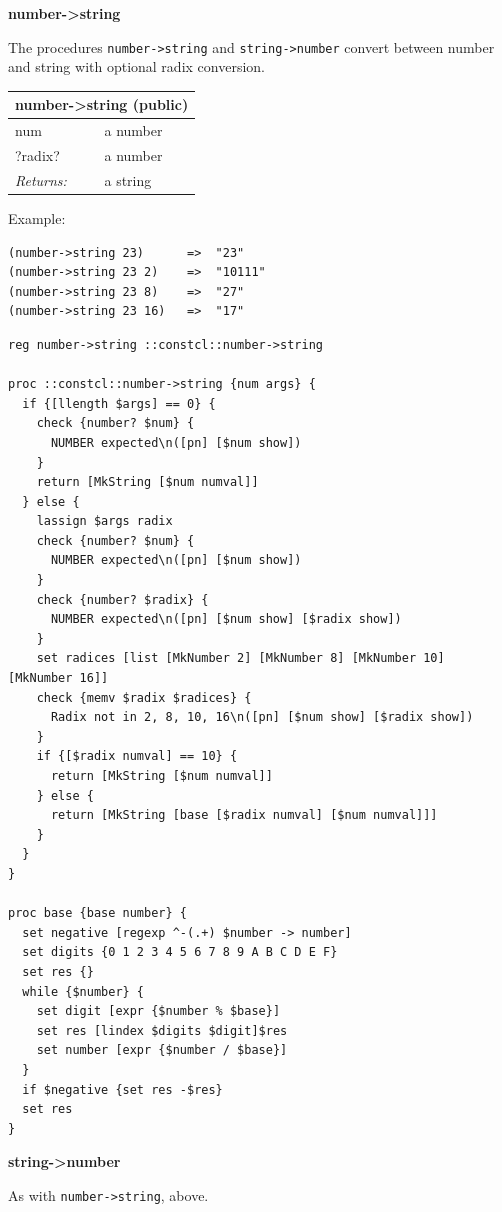 \documentclass[twoside,9pt]{report}
\begin{document}
\textbf{number->string}


The procedures \texttt{number->string} and \texttt{string->number} convert between number and string with optional radix conversion.

\begin{tabular}{ |l l| }
\hline
\multicolumn{2}{|l|}{number->string (public)} \\
\hline
num & a number \\
?radix? & a number \\
\textit{Returns:} & a string \\
\hline
\end{tabular}


Example:

\noindent\makebox[\linewidth]{\rule{\linewidth}{0.4pt}}
\begin{lstlisting}
(number->string 23)      =>  "23"
(number->string 23 2)    =>  "10111"
(number->string 23 8)    =>  "27"
(number->string 23 16)   =>  "17"
\end{lstlisting}
\noindent\makebox[\linewidth]{\rule{\linewidth}{0.4pt}}
\noindent\makebox[\linewidth]{\rule{\linewidth}{0.4pt}}
\begin{lstlisting}
reg number->string ::constcl::number->string
 
proc ::constcl::number->string {num args} {
  if {[llength $args] == 0} {
    check {number? $num} {
      NUMBER expected\n([pn] [$num show])
    }
    return [MkString [$num numval]]
  } else {
    lassign $args radix
    check {number? $num} {
      NUMBER expected\n([pn] [$num show])
    }
    check {number? $radix} {
      NUMBER expected\n([pn] [$num show] [$radix show])
    }
    set radices [list [MkNumber 2] [MkNumber 8] [MkNumber 10] [MkNumber 16]]
    check {memv $radix $radices} {
      Radix not in 2, 8, 10, 16\n([pn] [$num show] [$radix show])
    }
    if {[$radix numval] == 10} {
      return [MkString [$num numval]]
    } else {
      return [MkString [base [$radix numval] [$num numval]]]
    }
  }
}
 
proc base {base number} {
  set negative [regexp ^-(.+) $number -> number]
  set digits {0 1 2 3 4 5 6 7 8 9 A B C D E F}
  set res {}
  while {$number} {
    set digit [expr {$number % $base}]
    set res [lindex $digits $digit]$res
    set number [expr {$number / $base}]
  }
  if $negative {set res -$res}
  set res
}
\end{lstlisting}
\noindent\makebox[\linewidth]{\rule{\linewidth}{0.4pt}}

\textbf{string->number}


As with \texttt{number->string}, above.
\end{document}
